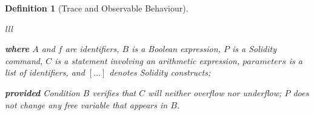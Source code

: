 \documentclass[manuscript,screen,review]{acmart}
\newtheorem{definition}{Definition}
\begin{document}
\begin{definition}[Trace and Observable Behaviour]
\begin{refactoring}[H]
\begin{footnotesize}
\begin{tabular}{lll}
\end{tabular}

\noindent \textbf{where} $A$ and $f$ are identifiers, $B$ is a Boolean expression, $P$ is a Solidity command, $C$ is a statement involving an arithmetic expression, $\mathit{parameters}$ is a list of identifiers, and $[\ldots]$ denotes Solidity constructs;

\noindent \textbf{provided} Condition $B$ verifies that $C$ will neither overflow nor underflow; $P$ does not change any free variable that appears in $B$.

\caption{Use \texttt{unchecked\{\}} for validated operations.}
\label{rule:unchecked}
\end{footnotesize}
\end{refactoring}


\end{definition}
\end{document}
